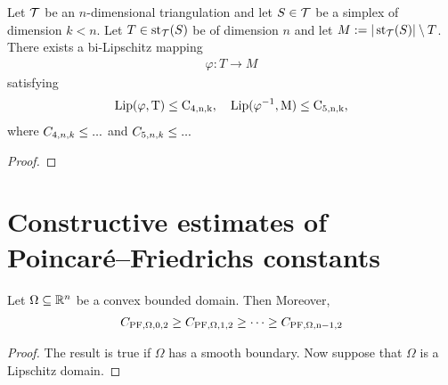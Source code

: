 \documentclass[12pt,a4paper]{article}
\begin{document}
\begin{theorem}
    Let ${\mathcal T}$ be an $n$-dimensional triangulation and let $S \in {\mathcal T}$ be a simplex of dimension $k < n$.
    Let $T \in \operatorname{st}_{{\mathcal T}}(S)$ be of dimension $n$ and let $M := |\operatorname{st}_{{\mathcal T}}(S)| \setminus T$. 
    There exists a bi-Lipschitz mapping
    \begin{align*}
        \varphi : T \rightarrow M
    \end{align*}
    satisfying
    \begin{align*}
        \rm{Lip}( \varphi,      T ) \leq C_{4,n,k},
        \quad 
        \rm{Lip}( \varphi^{-1}, M ) \leq C_{5,n,k},
    \end{align*}
    where $C_{4,n,k} \leq ...$ and $C_{5,n,k} \leq ...$
\end{theorem}
\begin{proof}

\end{proof}








































\section{Constructive estimates of Poincar\'e--Friedrichs constants}\label{section:poincarefriedrichs}





\begin{proposition}\label{proposition:guerinisavo}
    Let $\Omega \subseteq {\mathbb R}^{n}$ be a convex bounded domain. Then 
    Moreover, 
    \begin{align*}
        C_{\rm{PF},\Omega,0,2} \geq C_{\rm{PF},\Omega,1,2} \geq \dots \geq C_{\rm{PF},\Omega,n-1,2}
    \end{align*}
\end{proposition}
\begin{proof}
    The result is true if $\Omega$ has a smooth boundary. 
    Now suppose that $\Omega$ is a Lipschitz domain. 
\end{proof}
\end{document}
